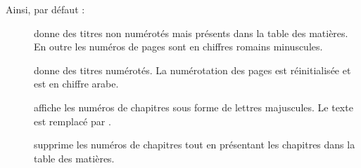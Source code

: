Ainsi, par défaut : \begin{description}
\item[] donne des titres non numérotés mais présents dans la table des matières. En outre les numéros de pages sont en chiffres romains minuscules. 
\item[] donne des titres numérotés. La numérotation des pages est réinitialisée et est en chiffre arabe.
\item[] affiche les numéros de chapitres sous forme de lettres majuscules. Le texte  est remplacé par .
\item[] supprime les numéros de chapitres tout en présentant les chapitres dans la table des matières.
\end{description}

